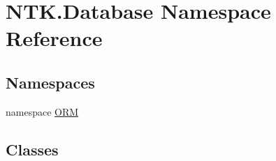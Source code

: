 \hypertarget{namespace_n_t_k_1_1_database}{}\section{N\+T\+K.\+Database Namespace Reference}
\label{namespace_n_t_k_1_1_database}
\subsection*{Namespaces}
\begin{DoxyCompactItemize}
\item 
namespace \mbox{\hyperlink{namespace_n_t_k_1_1_database_1_1_o_r_m}{O\+RM}}
\end{DoxyCompactItemize}
\subsection*{Classes}
